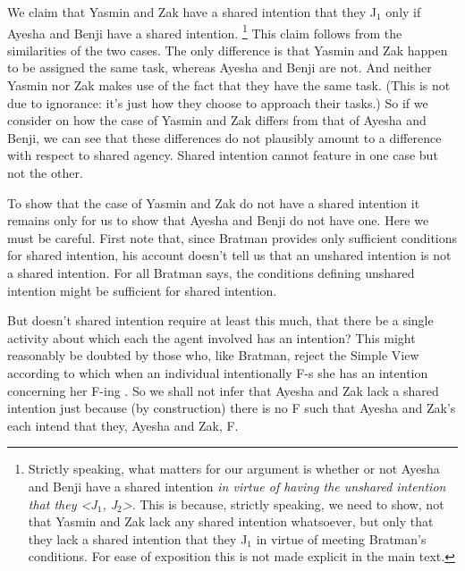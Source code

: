 \documentclass[12pt,\papersize]{extarticle}
\begin{document}
We claim that Yasmin and Zak have a shared intention that they J$_1$
only if 
Ayesha and Benji have a shared intention.%
\footnote{
Strictly speaking, 
	what matters for our argument is whether or not Ayesha and Benji have a shared intention \emph{in virtue of having the unshared intention that they <J$_1$, J$_2$>}.
	This is because, strictly speaking, we need to show, not that Yasmin and Zak lack any shared intention whatsoever, but only that they lack a shared intention that they J$_1$ in virtue of meeting Bratman's conditions. 
	For ease of exposition this is not made explicit in the main text.
} 
This claim follows from the similarities of the two cases.
The only difference is that Yasmin and Zak happen to be assigned the same task, whereas Ayesha and Benji are not.
And neither Yasmin nor Zak makes use of the fact that they have the same task. 
(This is not due to ignorance: it's just how they choose to approach their tasks.)
So if we consider on how  
		the case of Yasmin and Zak
	differs from
		 that of Ayesha and Benji,
we can see that these differences do not plausibly amount to a difference with respect to shared agency.
Shared intention cannot feature in one case but not the other.

To show that the case of Yasmin and Zak do not have a shared intention it remains only for us to show that Ayesha and Benji do not have one. 
Here we must be careful.
First note that,
	 since Bratman provides only sufficient conditions for shared intention, 
	 his account doesn't tell us that an unshared intention is not a shared intention.
For all Bratman says, the conditions defining unshared intention might  be sufficient for shared intention. 

But doesn't shared intention require at least this much,
that there be a single activity  about which each the agent involved has an intention? 
This might reasonably be doubted by those who, like Bratman, reject the Simple View according to which when an individual intentionally F-s she has an intention concerning her F-ing \citep{Bratman:1984jr}.
So 
	we shall not infer  that Ayesha and Zak lack a shared intention
	just because (by construction) there is no F such that Ayesha and Zak's each intend that they, Ayesha and Zak, F.
\end{document}
